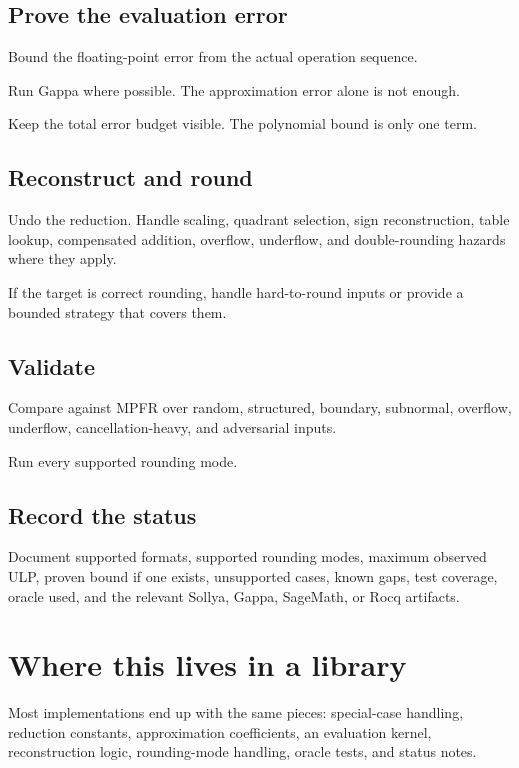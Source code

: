 \documentclass[manuscript, nonacm]{acmart}
\begin{document}
  \subsection{Prove the evaluation error}

  Bound the floating-point error from the actual operation sequence.

  Run Gappa where possible. The approximation error alone is not enough.

  Keep the total error budget visible. The polynomial bound is only one term.

  \subsection{Reconstruct and round}

  Undo the reduction. Handle scaling, quadrant selection, sign reconstruction,
  table lookup, compensated addition, overflow, underflow, and double-rounding
  hazards where they apply.

  If the target is correct rounding, handle hard-to-round inputs or provide a
  bounded strategy that covers them.

  \subsection{Validate}

  Compare against MPFR over random, structured, boundary, subnormal, overflow,
  underflow, cancellation-heavy, and adversarial inputs.

  Run every supported rounding mode.

  \subsection{Record the status}

  Document supported formats, supported rounding modes, maximum observed ULP,
  proven bound if one exists, unsupported cases, known gaps, test coverage,
  oracle used, and the relevant Sollya, Gappa, SageMath, or Rocq artifacts.



  \section{Where this lives in a library}

  Most implementations end up with the same pieces: special-case handling,
  reduction constants, approximation coefficients, an evaluation kernel,
  reconstruction logic, rounding-mode handling, oracle tests, and status notes.
\end{document}
